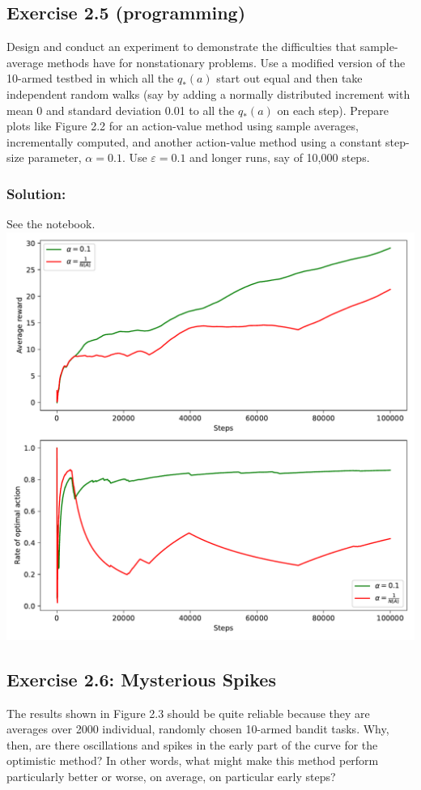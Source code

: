 \subsection*{Exercise 2.5 (programming)} 
 Design and conduct an experiment to demonstrate the
difficulties that sample-average methods have for nonstationary problems. Use a modified
version of the 10-armed testbed in which all the $q_*(a)$ start out equal and then take
independent random walks (say by adding a normally distributed increment with mean 0
and standard deviation 0.01 to all the $q_*(a)$ on each step). Prepare plots like Figure 2.2
for an action-value method using sample averages, incrementally computed, and another
action-value method using a constant step-size parameter, $\alpha = 0.1$. Use $\varepsilon = 0.1$ and
longer runs, say of 10,000 steps. 

\subsubsection*{Solution:}

See the notebook. \\
\includegraphics[width=\textwidth, angle=0]{chapters_latex/figures/ex_02_05.pdf}


\subsection*{Exercise 2.6: Mysterious Spikes} 
The results shown in Figure 2.3 should be quite reliable
because they are averages over 2000 individual, randomly chosen 10-armed bandit tasks.
Why, then, are there oscillations and spikes in the early part of the curve for the optimistic
method? In other words, what might make this method perform particularly better or
worse, on average, on particular early steps?

